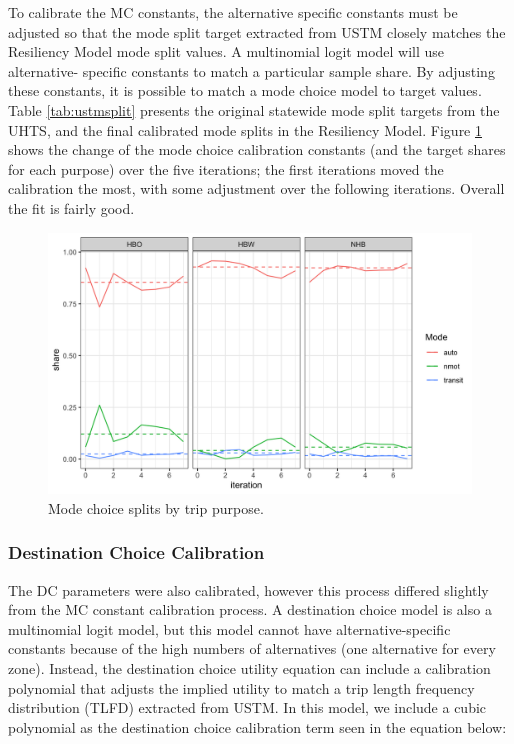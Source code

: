 To calibrate the MC constants, the alternative specific constants must be
adjusted so that the mode split target extracted from USTM closely matches the
Resiliency Model mode split values. A multinomial logit model will use alternative-
specific constants to match a particular sample share. By adjusting these
constants, it is possible to match a mode choice model to target values.
Table \ref{tab:ustmsplit} presents the original statewide mode split targets from the UHTS,
and the final calibrated mode splits in the Resiliency Model.
Figure \ref{fig:nhbmc} shows the change of the mode choice calibration constants
(and the target shares for each purpose) over the five iterations;
the first iterations moved the calibration the most, with some adjustment
over the following iterations. Overall the fit is fairly good.

  \begin{figure}

  {\centering \includegraphics[width=0.75\linewidth]{figures/chapter3/MC_split.png}

  }

  \caption{Mode choice splits by trip purpose.}\label{fig:nhbmc}
  \end{figure}

\subsubsection{Destination Choice Calibration}

The DC parameters were also calibrated, however this process differed slightly from the MC constant calibration process. A destination choice model is also a multinomial logit model, but this model cannot have alternative-specific constants because of the high numbers of alternatives (one alternative for every zone). Instead, the destination choice utility equation can include a calibration polynomial that adjusts the implied utility to match a trip length frequency distribution (TLFD) extracted from USTM. In this model, we include a cubic polynomial as the destination choice calibration term seen in the equation below:

